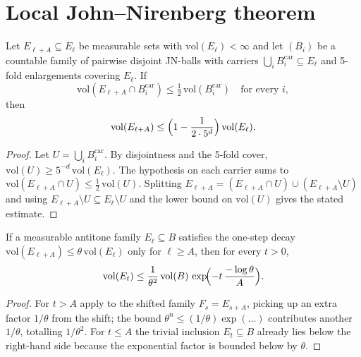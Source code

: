 \section{Local John--Nirenberg theorem}

\begin{lemma}
\label{lem:john_nirenberg_level_set_decay}
\leanok
{}
Let $E_{\ell+A} \subseteq E_{\ell}$ be measurable sets with $\mathrm{vol}(E_{\ell}) < \infty$
and let $(B_i)$ be a countable family of pairwise disjoint JN-balls with carriers
$\bigcup_i B_i^{\mathrm{car}} \subseteq E_{\ell}$ and 5-fold enlargements covering
$E_{\ell}$. If
\begin{equation*}
\mathrm{vol}(E_{\ell+A} \cap B_i^{\mathrm{car}}) \le \tfrac{1}{2}\, \mathrm{vol}(B_i^{\mathrm{car}})
\quad \text{for every } i,
\end{equation*}
then
\begin{equation*}
\mathrm{vol}(E_{\ell+A}) \le \Bigl(1 - \frac{1}{2 \cdot 5^{d}}\Bigr)\, \mathrm{vol}(E_{\ell}).
\end{equation*}
\end{lemma}
\begin{proof}
\leanok

Let $U = \bigcup_i B_i^{\mathrm{car}}$. By disjointness and the 5-fold cover,
$\mathrm{vol}(U) \ge 5^{-d}\, \mathrm{vol}(E_{\ell})$. The hypothesis on each carrier
sums to $\mathrm{vol}(E_{\ell+A}\cap U) \le \tfrac{1}{2}\,\mathrm{vol}(U)$. Splitting
$E_{\ell+A} = (E_{\ell+A}\cap U) \cup (E_{\ell+A}\setminus U)$ and using
$E_{\ell+A}\setminus U \subseteq E_{\ell}\setminus U$ and the lower bound on
$\mathrm{vol}(U)$ gives the stated estimate.
\end{proof}

\begin{theorem}
\label{thm:john_nirenberg_from_base}
\leanok
If a measurable antitone family $E_{\ell} \subseteq B$ satisfies the one-step decay
$\mathrm{vol}(E_{\ell+A}) \le \theta\,\mathrm{vol}(E_{\ell})$ only for $\ell \ge A$, then
for every $t > 0$,
\begin{equation*}
\mathrm{vol}(E_{t}) \le \frac{1}{\theta^{2}}\, \mathrm{vol}(B)\,
\exp\!\Bigl(-t\,\frac{-\log\theta}{A}\Bigr).
\end{equation*}
\end{theorem}
\begin{proof}
\leanok
{}

For $t > A$ apply  to the shifted family
$F_s = E_{s+A}$, picking up an extra factor $1/\theta$ from the shift; the bound
$\theta^{n} \le (1/\theta) \exp(\dots)$ contributes another $1/\theta$, totalling
$1/\theta^{2}$. For $t \le A$ the trivial inclusion
$E_{t} \subseteq B$ already lies below the right-hand side because the exponential factor
is bounded below by $\theta$.
\end{proof}

